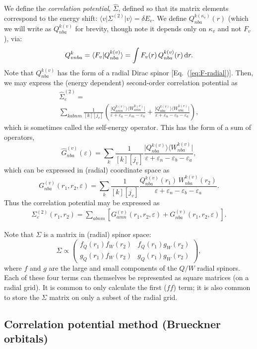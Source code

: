 \documentclass[10pt,twocolumn,a4paper]{article}%
\newcommand{\bra}[1]{\ensuremath{\langle #1|}}	%
\newcommand{\ket}[1]{\ensuremath{|#1\rangle}}	%
\newcommand{\braket}[1]{\ensuremath{\langle #1\rangle}}	%
\newcommand{\matr}[4]{\ensuremath{\begin{pmatrix}#1&#2\\#3&#4\end{pmatrix}}}	%
\newcommand{\be}{\begin{equation}}
\newcommand{\ee}{\end{equation}}
\def\d{\ensuremath{{\rm d}}}
\def\en{\ensuremath{\varepsilon}}
\begin{document}
We define the {\em correlation potential}, $\hat \Sigma$, defined so that its matrix elements correspond to the energy shift: $\bra{v}\Sigma^{(2)}\ket{v} = \delta E_v$.
We define
$Q^{k(\kappa_v)}_{nba}(r)$ (which we will write as $Q^{k(v)}_{nba}$ for brevity, though note it depends only on $\kappa_v$ and not $F_v$), via:
\be
Q^k_{vnba}
= \braket{F_v|Q^{k(v)}_{nba}}
= \int F_v(r) \, Q^{k(v)}_{nba}(r)\,\d r.
\ee
Note that $Q_{nba}^{k(v)}$ has the form of a radial Dirac spinor [Eq.~(\ref{eq:F-radial})].
Then, we may express the (energy dependent) second-order correlation potential as
\begin{multline}
\hat \Sigma^{(2)}_{\en} = \\
\sum_{kabnm}\frac{1}{[k][j_v]}\left(
\frac{\ket{Q^{k(v)}_{amn}}\bra{W^{k(v)}_{amn}}}
{\en + \en_a-\en_m-\en_n}
+
\frac{\ket{Q^{k(v)}_{nba}}\bra{W^{k(v)}_{nba}}}
{\en + \en_n-\en_b-\en_a}
\right),
\end{multline}
which is sometimes called the self-energy operator.
This has the form of a sum of operators,
\be
\hat G^{(v)}_{nba}(\en) = \sum_{k}\frac{1}{[k][j_v]}\frac{\ket{Q^{k(v)}_{nba}}\bra{W^{k(v)}_{nba}}}
{\en+\en_n-\en_b-\en_a},
\ee
which can be expressed in (radial) coordinate space as
\be
G^{(v)}_{nba}(r_1,r_2,\en) = \sum_{k}\frac{1}{[k][j_v]}
\frac{Q^{k(v)}_{nba}(r_1)\, W^{k(v)}_{nba}(r_2)}
{\en + \en_n-\en_b-\en_a}.
\ee
Thus the correlation potential may be expressed as
\begin{multline}
\Sigma^{(2)}_{\en}(r_1,r_2) =
\sum_{abnm}\left[
G^{(v)}_{amn}(r_1,r_2,\en)
+
G^{(v)}_{nba}(r_1,r_2,\en)
\right].
\end{multline}

Note that $\Sigma$ is a matrix in (radial) spinor space:
\be
\Sigma \propto \matr{f_Q(r_1)f_W(r_2)}{f_Q(r_1)g_W(r_2)}{g_Q(r_1)f_W(r_2)}{g_Q(r_1)g_W(r_2)},
\ee
where $f$ and $g$ are the large and small components of the $Q/W$ radial spinors.
Each of these four terms can themselves be represented as square matrices (on a radial grid).
It is common to only calculate the first ($ff$) term; it is also common to store the $\Sigma$ matrix on only a subset of the radial grid.

\subsection{Correlation potential method (Brueckner orbitals)}
\end{document}
